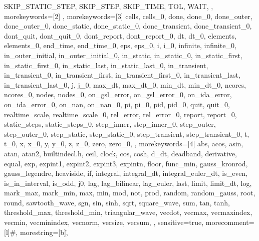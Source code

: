 {{      SKIP_STATIC_STEP,
      SKIP_STEP,
      SKIP_TIME,
      TOL,
      WAIT,
},
morekeywords={[2]
},
morekeywords={[3]
      cells,
      cells_0,
      done,
      done_0,
      done_outer,
      done_outer_0,
      done_static,
      done_static_0,
      done_transient,
      done_transient_0,
      dont_quit,
      dont_quit_0,
      dont_report,
      dont_report_0,
      dt,
      dt_0,
      elements,
      elements_0,
      end_time,
      end_time_0,
      eps,
      eps_0,
      i,
      i_0,
      infinite,
      infinite_0,
      in_outer_initial,
      in_outer_initial_0,
      in_static,
      in_static_0,
      in_static_first,
      in_static_first_0,
      in_static_last,
      in_static_last_0,
      in_transient,
      in_transient_0,
      in_transient_first,
      in_transient_first_0,
      in_transient_last,
      in_transient_last_0,
      j,
      j_0,
      max_dt,
      max_dt_0,
      min_dt,
      min_dt_0,
      ncores,
      ncores_0,
      nodes,
      nodes_0,
      on_gsl_error,
      on_gsl_error_0,
      on_ida_error,
      on_ida_error_0,
      on_nan,
      on_nan_0,
      pi,
      pi_0,
      pid,
      pid_0,
      quit,
      quit_0,
      realtime_scale,
      realtime_scale_0,
      rel_error,
      rel_error_0,
      report,
      report_0,
      static_steps,
      static_steps_0,
      step_inner,
      step_inner_0,
      step_outer,
      step_outer_0,
      step_static,
      step_static_0,
      step_transient,
      step_transient_0,
      t,
      t_0,
      x,
      x_0,
      y,
      y_0,
      z,
      z_0,
      zero,
      zero_0,
},
morekeywords={[4]
      abs,
      acos,
      asin,
      atan,
      atan2,
      builtindecl.h,
      ceil,
      clock,
      cos,
      cosh,
      d_dt,
      deadband,
      derivative,
      equal,
      exp,
      expint1,
      expint2,
      expint3,
      expintn,
      floor,
      func_min,
      gauss_kronrod,
      gauss_legendre,
      heaviside,
      if,
      integral,
      integral_dt,
      integral_euler_dt,
      is_even,
      is_in_interval,
      is_odd,
      j0,
      lag,
      lag_bilinear,
      lag_euler,
      last,
      limit,
      limit_dt,
      log,
      mark_max,
      mark_min,
      max,
      min,
      mod,
      not,
      prod,
      random,
      random_gauss,
      root,
      round,
      sawtooth_wave,
      sgn,
      sin,
      sinh,
      sqrt,
      square_wave,
      sum,
      tan,
      tanh,
      threshold_max,
      threshold_min,
      triangular_wave,
      vecdot,
      vecmax,
      vecmaxindex,
      vecmin,
      vecminindex,
      vecnorm,
      vecsize,
      vecsum,
},
sensitive=true,
morecomment=[l]{\#},
morestring=[b]\",
}
